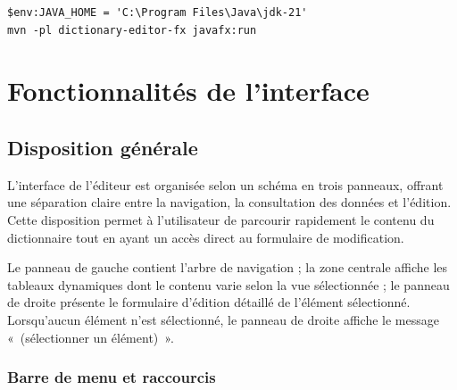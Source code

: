 \documentclass[11pt,twoside,openany]{book}
\begin{document}
\begin{verbatim}
$env:JAVA_HOME = 'C:\Program Files\Java\jdk-21'
mvn -pl dictionary-editor-fx javafx:run
\end{verbatim}


\chapter{Fonctionnalités de l'interface}

\section{Disposition générale}

L'interface de l'éditeur est organisée selon un schéma en trois panneaux, offrant une séparation claire entre la navigation, la consultation des données et l'édition. Cette disposition permet à l'utilisateur de parcourir rapidement le contenu du dictionnaire tout en ayant un accès direct au formulaire de modification.

\begin{center}
\end{center}

Le panneau de gauche contient l'arbre de navigation ; la zone centrale affiche les tableaux dynamiques dont le contenu varie selon la vue sélectionnée ; le panneau de droite présente le formulaire d'édition détaillé de l'élément sélectionné. Lorsqu'aucun élément n'est sélectionné, le panneau de droite affiche le message «~(sélectionner un élément)~».

\subsection{Barre de menu et raccourcis}
\end{document}
